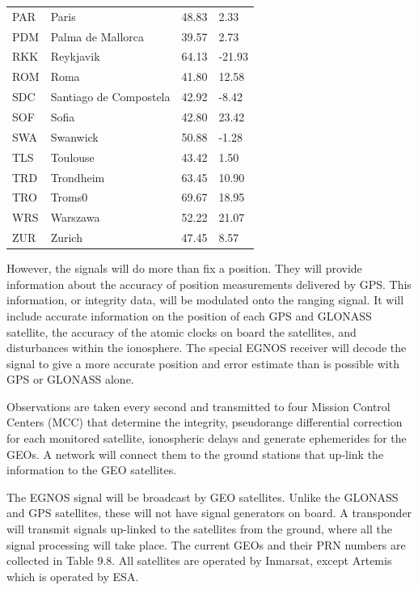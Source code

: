 \begin{table}
\begin{tabular}{llll}
					   PAR  & Paris & 48.83 & 2.33 \\
					   PDM  & Palma de Mallorca & 39.57 & 2.73 \\
					   RKK  & Reykjavik & 64.13 & -21.93 \\
					   ROM  & Roma & 41.80 & 12.58 \\
					   SDC  & Santiago de Compostela & 42.92 & -8.42 \\
					   SOF  & Sofia & 42.80 & 23.42 \\
					   SWA  & Swanwick & 50.88 & -1.28 \\
					   TLS  & Toulouse & 43.42 & 1.50 \\
					   TRD  & Trondheim & 63.45 & 10.90 \\
					   TRO  & Troms0 & 69.67 & 18.95 \\
					   WRS  & Warszawa & 52.22 & 21.07 \\
					   ZUR  & Zurich & 47.45 & 8.57 \\
				\hline 
			\end{tabular} 
		\end{table}
		However, the signals will do more than fix a position. They will provide information about the accuracy of position measurements delivered by GPS. This information, or integrity data, will be modulated onto the ranging signal. It will include accurate information on the position of each GPS and GLONASS satellite, the accuracy of the atomic clocks on board the satellites, and disturbances within the ionosphere. The special EGNOS receiver will decode the signal to give a more accurate position and error estimate than is possible with GPS or GLONASS alone.
		
		Observations are taken every second and transmitted to four Mission Control Centers (MCC) that determine the integrity, pseudorange differential correction for each monitored satellite, ionospheric delays and generate ephemerides for the GEOs. A network will connect them to the ground stations that up-link the information to the GEO satellites.
		
		The EGNOS signal will be broadcast by GEO satellites. Unlike the GLONASS and GPS satellites, these will not have signal generators on board. A transponder will transmit signals up-linked to the satellites from the ground, where all the signal processing will take place. The current GEOs and their PRN numbers are collected in Table 9.8. All satellites are operated by Inmarsat, except Artemis which is operated by ESA.
		
